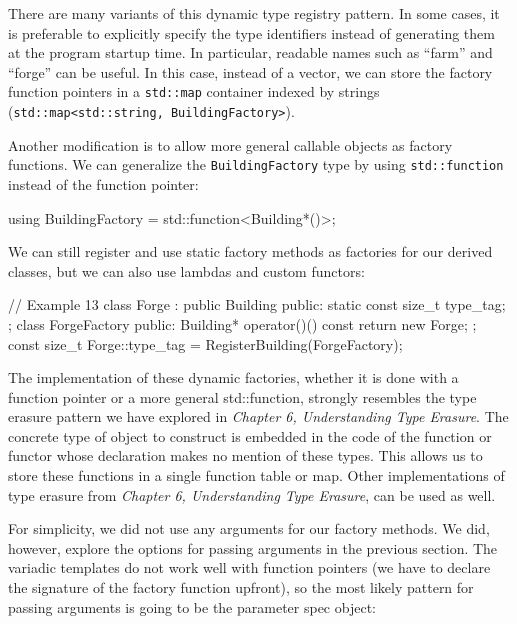 There are many variants of this dynamic type registry pattern. In some cases, it is preferable to explicitly specify the type identifiers instead of generating them at the program startup time. In particular, readable names such as ``farm'' and ``forge'' can be useful. In this case, instead of a vector, we can store the factory function pointers in a \texttt{std::map} container indexed by strings (\texttt{std::map\textless{}std::string,\ BuildingFactory\textgreater{}}).

Another modification is to allow more general callable objects as factory functions. We can generalize the \texttt{BuildingFactory} type by using \texttt{std::function} instead of the function pointer:

\begin{code}
using BuildingFactory = std::function<Building*()>;
\end{code}

We can still register and use static factory methods as factories for our derived classes, but we can also use lambdas and custom functors:

\begin{code}
// Example 13
class Forge : public Building {
  public:
  static const size_t type_tag;
};
class ForgeFactory {
  public:
  Building* operator()() const { return new Forge; }
};
const size_t Forge::type_tag =
  RegisterBuilding(ForgeFactory{});
\end{code}

The implementation of these dynamic factories, whether it is done with a function pointer or a more general std::function, strongly resembles the type erasure pattern we have explored in \emph{Chapter 6, Understanding Type Erasure}. The concrete type of object to construct is embedded in the code of the function or functor whose declaration makes no mention of these types. This allows us to store these functions in a single function table or map. Other implementations of type erasure from \emph{Chapter 6, Understanding Type Erasure}, can be used as well.

For simplicity, we did not use any arguments for our factory methods. We did, however, explore the options for passing arguments in the previous section. The variadic templates do not work well with function pointers (we have to declare the signature of the factory function upfront), so the most likely pattern for passing arguments is going to be the parameter spec object:

